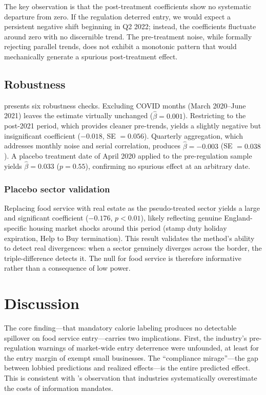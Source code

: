\documentclass[12pt]{article}
\begin{document}
The key observation is that the post-treatment coefficients show no systematic departure from zero. If the regulation deterred entry, we would expect a persistent negative shift beginning in Q2 2022; instead, the coefficients fluctuate around zero with no discernible trend. The pre-treatment noise, while formally rejecting parallel trends, does not exhibit a monotonic pattern that would mechanically generate a spurious post-treatment effect.

\subsection{Robustness}



 presents six robustness checks. Excluding COVID months (March 2020--June 2021) leaves the estimate virtually unchanged ($\hat{\beta} = 0.001$). Restricting to the post-2021 period, which provides cleaner pre-trends, yields a slightly negative but insignificant coefficient ($-0.018$, SE $= 0.056$). Quarterly aggregation, which addresses monthly noise and serial correlation, produces $\hat{\beta} = -0.003$ (SE $= 0.038$). A placebo treatment date of April 2020 applied to the pre-regulation sample yields $\hat{\beta} = 0.033$ ($p = 0.55$), confirming no spurious effect at an arbitrary date.

\subsubsection*{Placebo sector validation} Replacing food service with real estate as the pseudo-treated sector yields a large and significant coefficient ($-0.176$, $p < 0.01$), likely reflecting genuine England-specific housing market shocks around this period (stamp duty holiday expiration, Help to Buy termination). This result validates the method's ability to detect real divergences: when a sector genuinely diverges across the border, the triple-difference detects it. The null for food service is therefore informative rather than a consequence of low power.

\section{Discussion}

The core finding---that mandatory calorie labeling produces no detectable spillover on food service entry---carries two implications. First, the industry's pre-regulation warnings of market-wide entry deterrence were unfounded, at least for the entry margin of exempt small businesses. The ``compliance mirage''---the gap between lobbied predictions and realized effects---is the entire predicted effect. This is consistent with \citet{sunstein2020}'s observation that industries systematically overestimate the costs of information mandates.
\end{document}
